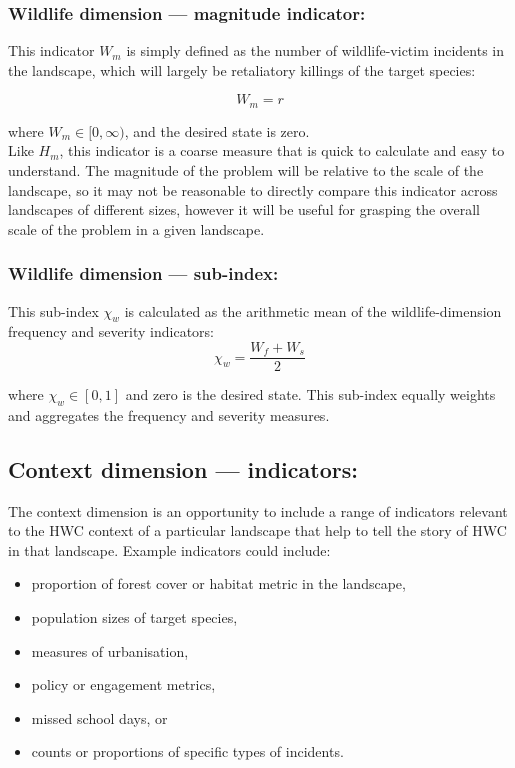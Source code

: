 \documentclass[fleqn,10pt]{olplainarticle}
\begin{document}
\subsubsection*{Wildlife dimension --- magnitude indicator:}
This indicator $W_m$ is simply defined as the number of wildlife-victim incidents in the landscape, which will largely be retaliatory killings of the target species:

\begin{equation*}
    W_m = r
\end{equation*}

where $W_m \in [0,\infty)$, and the desired state is zero.\\

Like $H_m$, this indicator is a coarse measure that is quick to calculate and easy to understand. The magnitude of the problem will be relative to the scale of the landscape, so it may not be reasonable to directly compare this indicator across landscapes of different sizes, however it will be useful for grasping the overall scale of the problem in a given landscape.\\

\subsubsection*{Wildlife dimension --- sub-index:}
This sub-index $\chi_w$ is calculated as the arithmetic mean of  the wildlife-dimension frequency and severity indicators:
\begin{equation*}
    \chi_w = \frac{W_f + W_s}{2}
\end{equation*}

where $\chi_w \in [0,1]$ and zero is the desired state. This sub-index equally weights and aggregates the frequency and severity measures.\\

\subsection*{Context dimension --- indicators:}
The context dimension is an opportunity to include a range of indicators relevant to the HWC context of a particular landscape that help to tell the story of HWC in that landscape. Example indicators could include:
\begin{itemize}
    \item proportion of forest cover or habitat metric in the landscape,
    \item population sizes of target species,
    \item measures of urbanisation,
    \item policy or engagement metrics,
    \item missed school days, or
    \item counts or proportions of specific types of incidents.
\end{itemize}
\end{document}
